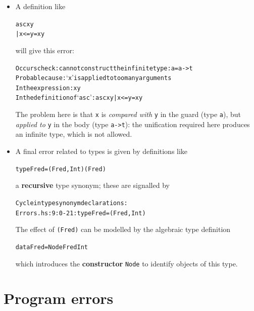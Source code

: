 \begin{itemize}
example,
\begin{alltt}
myCheck :: Char -> Bool
myCheck n = toEnum n == 6
\end{alltt}
gives the error message
\begin{alltt}
Couldn't match expected type `Int' against inferred type `Char'
In the first argument of `toEnum', namely `n'
In the first argument of `(==)', namely `toEnum n'
In the expression: toEnum n == 6
\end{alltt}
Without the type declaration the definition would be accepted, only to give
an error (presumably) when it is used.
\item
A definition like
\begin{alltt}
asc x y 
  | x <= y  = x y
\end{alltt}
will give this error:
\begin{alltt}
Occurs check: cannot construct the infinite type: a = a -> t
Probable cause: `x' is applied to too many arguments
In the expression: x y
In the definition of `asc': asc x y | x <= y = x y
\end{alltt}
The problem here is that \texttt{x} is \emph{compared with} \texttt{y} in the guard (type \texttt{a}), but \emph{applied to} \texttt{y} in the body (type \texttt{a->t}): the unification required here produces an infinite type, which is not allowed.
\item
A final error related to types is given by definitions like
\begin{alltt}
type Fred = (Fred,Int) \hfill (Fred)
\end{alltt}
a \textbf{recursive\/} type synonym; these are signalled by
\begin{alltt}
Cycle in type synonym declarations:
  Errors.hs:9:0-21: type Fred = (Fred, Int)
\end{alltt}
The effect of \texttt{(Fred)} can be modelled by the algebraic type definition
\begin{alltt}
data Fred = Node Fred Int
\end{alltt}
which introduces the \textbf{constructor\/} \texttt{Node} to identify objects of
this type.
\end{itemize}


\section*{Program errors}

